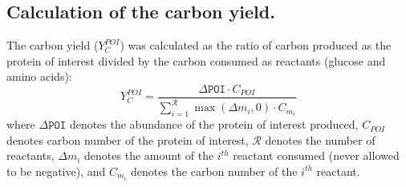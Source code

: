 \documentclass[journal=asbcd6,manuscript=article]{achemso}
\begin{document}
%
%
%

\subsection*{Calculation of the carbon yield.}
The carbon yield ($Y_{C}^{POI}$) was calculated as the ratio of carbon produced as the protein of interest divided by the carbon consumed as reactants (glucose and amino acids):
\begin{equation}\label{eqn:yield-definition}
	Y_{C}^{POI}=\frac{\Delta\texttt{POI}\cdot C_{POI}}{\displaystyle\sum_{i=1}^{\mathcal{R}}\max(\Delta m_{i},0)\cdot C_{m_i}}
\end{equation}
where $\Delta\texttt{POI}$ denotes the abundance of the protein of interest produced, $C_{POI}$ denotes carbon number of the protein of interest, $\mathcal{R}$ denotes the number of reactants,
$\Delta m_{i}$ denotes the amount of the $i^{th}$ reactant consumed (never allowed to be negative), and $C_{m_i}$ denotes the carbon number of the $i^{th}$ reactant.
\end{document}
